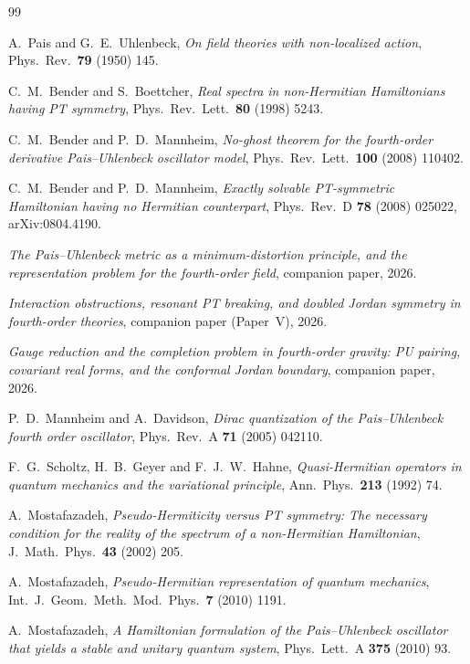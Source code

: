 \documentclass[11pt]{article}
\theoremstyle{definition}
\theoremstyle{remark}
\begin{document}
\begin{thebibliography}{99}

A.~Pais and G.~E.~Uhlenbeck,
\emph{On field theories with non-localized action},
Phys.\ Rev.\ \textbf{79} (1950) 145.

C.~M.~Bender and S.~Boettcher,
\emph{Real spectra in non-Hermitian Hamiltonians having PT symmetry},
Phys.\ Rev.\ Lett.\ \textbf{80} (1998) 5243.

C.~M.~Bender and P.~D.~Mannheim,
\emph{No-ghost theorem for the fourth-order derivative Pais--Uhlenbeck
oscillator model},
Phys.\ Rev.\ Lett.\ \textbf{100} (2008) 110402.

C.~M.~Bender and P.~D.~Mannheim,
\emph{Exactly solvable PT-symmetric Hamiltonian having no Hermitian
counterpart},
Phys.\ Rev.\ D \textbf{78} (2008) 025022, arXiv:0804.4190.

\emph{The Pais--Uhlenbeck metric as a minimum-distortion principle, and
the representation problem for the fourth-order field}, companion paper,
2026.

\emph{Interaction obstructions, resonant PT breaking, and doubled Jordan
symmetry in fourth-order theories}, companion paper (Paper~V), 2026.

\emph{Gauge reduction and the completion problem in fourth-order gravity:
PU pairing, covariant real forms, and the conformal Jordan boundary},
companion paper, 2026.

P.~D.~Mannheim and A.~Davidson,
\emph{Dirac quantization of the Pais--Uhlenbeck fourth order oscillator},
Phys.\ Rev.\ A \textbf{71} (2005) 042110.

F.~G.~Scholtz, H.~B.~Geyer and F.~J.~W.~Hahne,
\emph{Quasi-Hermitian operators in quantum mechanics and the variational
principle},
Ann.\ Phys.\ \textbf{213} (1992) 74.

A.~Mostafazadeh,
\emph{Pseudo-Hermiticity versus PT symmetry: The necessary condition for the
reality of the spectrum of a non-Hermitian Hamiltonian},
J.\ Math.\ Phys.\ \textbf{43} (2002) 205.

A.~Mostafazadeh,
\emph{Pseudo-Hermitian representation of quantum mechanics},
Int.\ J.\ Geom.\ Meth.\ Mod.\ Phys.\ \textbf{7} (2010) 1191.

A.~Mostafazadeh,
\emph{A Hamiltonian formulation of the Pais--Uhlenbeck oscillator that yields
a stable and unitary quantum system},
Phys.\ Lett.\ A \textbf{375} (2010) 93.


\end{thebibliography}
\end{document}
